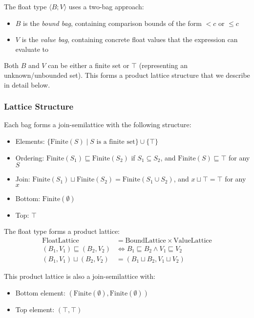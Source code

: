 The float type \float$\langle B; V \rangle$ uses a two-bag approach:
\begin{itemize}
    \item $B$ is the \emph{bound bag}, containing comparison bounds of the form $< c$ or $\leq c$
    \item $V$ is the \emph{value bag}, containing concrete float values that the expression can evaluate to
\end{itemize}

Both $B$ and $V$ can be either a finite set or $\top$ (representing an unknown/unbounded set). This forms a product lattice structure that we describe in detail below.

\subsubsection{Lattice Structure}

Each bag forms a join-semilattice with the following structure:
\begin{itemize}
    \item Elements: $\{\text{Finite}(S) \mid S \text{ is a finite set}\} \cup \{\top\}$
    \item Ordering: $\text{Finite}(S_1) \sqsubseteq \text{Finite}(S_2)$ if $S_1 \subseteq S_2$, and $\text{Finite}(S) \sqsubseteq \top$ for any $S$
    \item Join: $\text{Finite}(S_1) \sqcup \text{Finite}(S_2) = \text{Finite}(S_1 \cup S_2)$, and $x \sqcup \top = \top$ for any $x$
    \item Bottom: $\text{Finite}(\emptyset)$
    \item Top: $\top$
\end{itemize}

The float type forms a product lattice:
\begin{align}
\text{FloatLattice} &= \text{BoundLattice} \times \text{ValueLattice} \\
(B_1, V_1) \sqsubseteq (B_2, V_2) &\iff B_1 \sqsubseteq B_2 \land V_1 \sqsubseteq V_2 \\
(B_1, V_1) \sqcup (B_2, V_2) &= (B_1 \sqcup B_2, V_1 \sqcup V_2)
\end{align}

This product lattice is also a join-semilattice with:
\begin{itemize}
    \item Bottom element: $(\text{Finite}(\emptyset), \text{Finite}(\emptyset))$
    \item Top element: $(\top, \top)$
\end{itemize}

